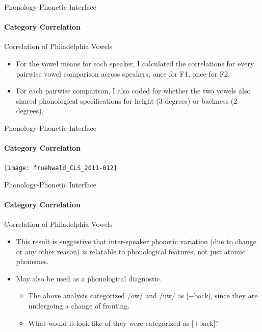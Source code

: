 \documentclass[]{beamer}
\begin{document}
\begin{frame}{Phonology-Phonetic Interface}
	\framesubtitle{Category Correlation}
	
	\begin{block}{Correlation of Philadelphia Vowels}
		\begin{itemize}
			\item For the vowel means for each speaker, I calculated the correlations for every pairwise vowel
			comparison across speakers, once for F1, once for F2.
			\item For each pairwise comparison, I also coded for whether the two vowels also 
			shared phonological specifications for height (3 degrees) or backness (2 degrees).
		\end{itemize}
	\end{block}
\end{frame}





\begin{frame}{Phonology-Phonetic Interface}
	\framesubtitle{Category Correlation}
\texttt{[image: fruehwald\_CLS\_2011-012]}
\end{frame}




\begin{frame}{Phonology-Phonetic Interface}
	\framesubtitle{Category Correlation}
	
	\begin{block}{Correlation of Philadelphia Vowels}
		\begin{itemize}
			\item This result is suggestive that inter-speaker phonetic variation (due to change or any other reason) is relatable
					to phonological features, not just atomic phonemes.
			\item May also be used as a phonological diagnostic.
				\begin{itemize}
					\item The above analysis categorized /ow/ and /uw/ as [$-$back], since they are undergoing a change of fronting.
					\item What would it look like of they were categorized as [$+$back]?
				\end{itemize}
		\end{itemize}
	\end{block}

\end{frame}
\end{document}
